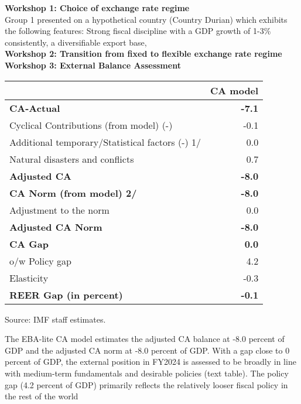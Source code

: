 \documentclass[12pt]{article}
\begin{document}
\textbf{Workshop 1: Choice of exchange rate regime} \\

     Group 1 presented on a hypothetical country (Country Durian) which exhibits the following features: Strong fiscal discipline with a GDP growth of 1-3\% consistently, a diversifiable export base, \\
\textbf{Workshop 2: Transition from fixed to flexible exchange rate regime} \\
\textbf{Workshop 3: External Balance Assessment} \\



\begin{table}[h!]
\centering
\renewcommand{\arraystretch}{1.3} %

\begin{tabular}{@{}l r@{}} %
\hline
 & \textbf{CA model} \\
\hline
\textbf{CA-Actual} & \textbf{-7.1} \\
\quad Cyclical Contributions (from model) (-) & -0.1 \\
\quad Additional temporary/Statistical factors (-) 1/ & 0.0 \\
\quad Natural disasters and conflicts & 0.7 \\
\textbf{Adjusted CA} & \textbf{-8.0} \\[6pt]

\textbf{CA Norm (from model) 2/} & \textbf{-8.0} \\
\quad Adjustment to the norm & 0.0 \\
\textbf{Adjusted CA Norm} & \textbf{-8.0} \\[6pt]

\textbf{CA Gap} & \textbf{0.0} \\
\quad o/w Policy gap & 4.2 \\[6pt]

Elasticity & -0.3 \\
\textbf{REER Gap (in percent)} & \textbf{-0.1} \\
\hline
\end{tabular}

\vspace{2pt}

\centering
\quad \quad \parbox{\linewidth}{\hspace{0pt}\footnotesize Source: IMF staff estimates.}

\end{table}
The EBA-lite CA model estimates the adjusted CA balance at -8.0 percent of GDP and the 
adjusted CA norm at -8.0 percent of GDP. With a gap close to 0 percent of GDP, the external position in 
FY2024 is assessed to be broadly in line with medium-term fundamentals and desirable policies (text table). 
The policy gap (4.2 percent of GDP) primarily reflects the relatively looser fiscal policy in the rest of the 
world
\end{document}
